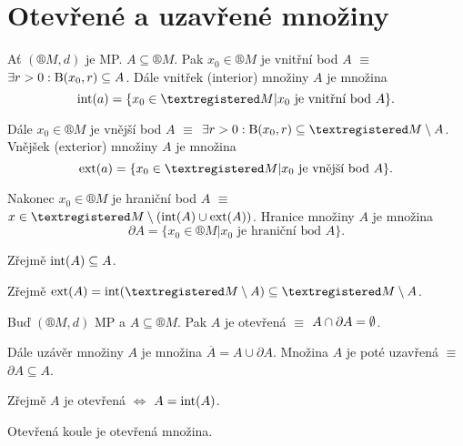 \documentclass[12pt]{article}					%
\begin{document}
\section{Otevřené a uzavřené množiny}
    \begin{definice}
        Ať $(®M, d)$ je MP. $A \subseteq ®M$. Pak $x_0 \in ®M$ je vnitřní bod $A$ $≡$ $\exists r > 0: \operatorname{B}(x_0, r) \subseteq A$. Dále vnitřek (interior) množiny $A$ je množina
        $$ \Int(a) = \{x_0 \in ®M| x_0 \text{ je vnitřní bod } A\}. $$ 

        Dále $x_0 \in ®M$ je vnější bod $A$ $≡$ $\exists r>0: \B(x_0, r) \subseteq ®M \setminus A$. Vnějšek (exterior) množiny $A$ je množina
        $$ \Ext(a) = \{x_0 \in ®M| x_0 \text{ je vnější bod } A\}. $$

        Nakonec $x_0 \in ®M$ je hraniční bod $A$ $≡$ $x \in ®M \setminus (\Int(A) \cup \Ext(A))$. Hranice množiny $A$ je množina
        $$ \partial A = \{x_0 \in ®M | x_0 \text{ je hraniční bod } A\}. $$ 
    \end{definice}

    \begin{pozorovani}
        Zřejmě $\operatorname{int}(A) \subseteq A$.

        Zřejmě $\Ext(A) = \Int(®M \setminus A) \subseteq ®M \setminus A$.
    \end{pozorovani}

    \begin{definice}
        Buď $(®M, d)$ MP a $A \subseteq ®M$. Pak $A$ je otevřená $≡$ $A \cap \partial A = \emptyset$.

        Dále uzávěr množiny $A$ je množina $\overline{A} = A \cup \partial A$. Množina $A$ je poté uzavřená $≡$ $\partial A \subseteq A$.
    \end{definice}

    \begin{pozorovani}
        Zřejmě $A$ je otevřená $\Leftrightarrow$ $A = \operatorname{int}(A)$.

        Otevřená koule je otevřená množina.
    \end{pozorovani}
\end{document}
